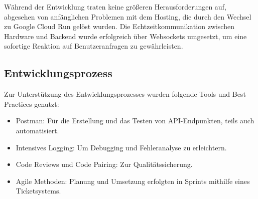 Während der Entwicklung traten keine größeren Herausforderungen auf, abgesehen von anfänglichen 
Problemen mit dem Hosting, die durch den Wechsel zu Google Cloud Run gelöst wurden. Die 
Echtzeitkommunikation zwischen Hardware und Backend wurde erfolgreich über Websockets umgesetzt, 
um eine sofortige Reaktion auf Benutzeranfragen zu gewährleisten.


\subsection{Entwicklungsprozess}

Zur Unterstützung des Entwicklungsprozesses wurden folgende Tools und Best Practices genutzt:
\begin{itemize}
	\item Postman: Für die Erstellung und das Testen von API-Endpunkten, teils auch automatisiert.
	\item Intensives Logging: Um Debugging und Fehleranalyse zu erleichtern.
	\item Code Reviews und Code Pairing: Zur Qualitätssicherung.
	\item Agile Methoden: Planung und Umsetzung erfolgten in Sprints mithilfe eines Ticketsystems.
\end{itemize}